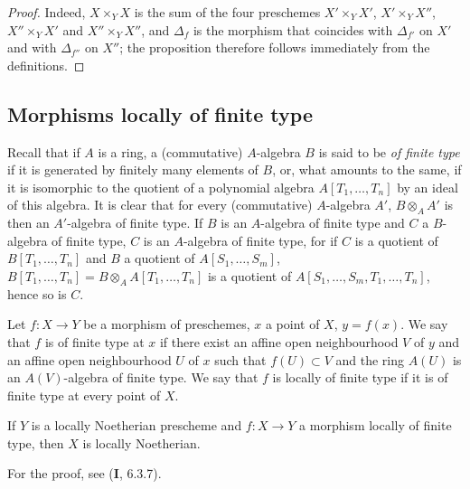 \begin{proof}
Indeed, $X\times_YX$ is the sum of the four preschemes
$X'\times_YX'$, $X'\times_YX''$, $X''\times_YX'$ and $X''\times_YX''$, and
$\Delta_f$ is the morphism that coincides with $\Delta_{f'}$ on $X'$ and with
$\Delta_{f''}$ on $X''$; the proposition therefore follows immediately from
the definitions.
\end{proof}

\subsection{Morphisms locally of finite type}
\label{subsection:IV.1.3}

\begin{env}[1.3.1]
\label{IV.1.3.1}
Recall that if $A$ is a ring, a (commutative) $A$-algebra $B$ is said to be
\emph{of finite type} if it is generated by finitely many elements of
$B$, or, what amounts to the same, if it is isomorphic to the quotient of a
polynomial algebra $A[T_1,\ldots,T_n]$ by an ideal of this algebra. It is
clear that for every (commutative) $A$-algebra $A'$,
$B\otimes_AA'$ is then an $A'$-algebra of finite type. If $B$ is an
$A$-algebra of finite type and $C$ a $B$-algebra of finite type, $C$ is an
$A$-algebra of finite type, for if $C$ is a quotient of
$B[T_1,\ldots,T_n]$ and $B$ a quotient of $A[S_1,\ldots,S_m]$,
$B[T_1,\ldots,T_n]=B\otimes_AA[T_1,\ldots,T_n]$ is a quotient of
$A[S_1,\ldots,S_m,T_1,\ldots,T_n]$, hence so is $C$.
\end{env}

\begin{definition}[1.3.2]
\label{IV.1.3.2}
Let $f:X\to Y$ be a morphism of preschemes, $x$ a point of $X$,
$y=f(x)$. We say that $f$ is of finite type at $x$ if there exist an
affine open neighbourhood $V$ of $y$ and an affine open neighbourhood $U$ of
$x$ such that $f(U)\subset V$ and the ring $A(U)$ is an $A(V)$-algebra of
finite type. We say that $f$ is locally of finite type if it is of
finite type at every point of $X$.
\end{definition}


\begin{proposition}[1.3.3]
\label{IV.1.3.3}
If $Y$ is a locally Noetherian prescheme and $f:X\to Y$ a morphism
locally of finite type, then $X$ is locally Noetherian.
\end{proposition}

For the proof, see (\textbf{I}, 6.3.7).

